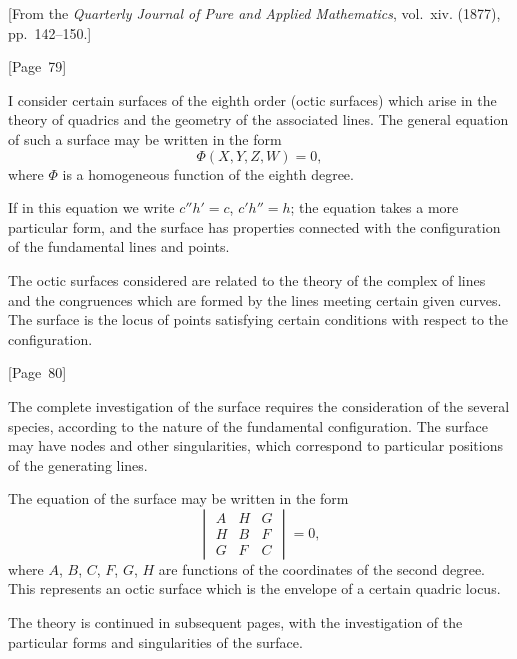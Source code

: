 \documentclass[11pt,a4paper]{article}
\theoremstyle{plain}
\theoremstyle{definition}
\theoremstyle{remark}
\begin{document}
[From the \textit{Quarterly Journal of Pure and Applied Mathematics},
vol.~xiv. (1877), pp.~142--150.]

\begin{center}
[Page~79]
\end{center}

I consider certain surfaces of the eighth order (octic surfaces)
which arise in the theory of quadrics and the geometry of the
associated lines. The general equation of such a surface may be
written in the form
\[
\Phi(X,Y,Z,W) = 0,
\]
where $\Phi$ is a homogeneous function of the eighth degree.

If in this equation we write $c''h' = c$, $c'h'' = h$; the equation
takes a more particular form, and the surface has properties connected
with the configuration of the fundamental lines and points.

The octic surfaces considered are related to the theory of the
complex of lines and the congruences which are formed by the lines
meeting certain given curves. The surface is the locus of points
satisfying certain conditions with respect to the configuration.

\begin{center}
[Page~80]
\end{center}

The complete investigation of the surface requires the consideration
of the several species, according to the nature of the fundamental
configuration. The surface may have nodes and other singularities,
which correspond to particular positions of the generating lines.

The equation of the surface may be written in the form
\[
\begin{vmatrix}
A & H & G \\
H & B & F \\
G & F & C
\end{vmatrix} = 0,
\]
where $A$, $B$, $C$, $F$, $G$, $H$ are functions of the coordinates of
the second degree. This represents an octic surface which is the
envelope of a certain quadric locus.

The theory is continued in subsequent pages, with the investigation
of the particular forms and singularities of the surface.
\end{document}
